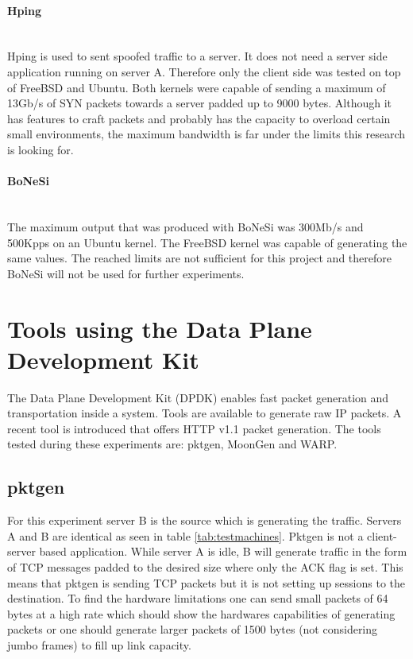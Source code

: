 \paragraph{Hping}\mbox{}\\
Hping is used to sent spoofed traffic to a server. 
It does not need a server side application running on server A. Therefore only the client side was tested on top of FreeBSD and Ubuntu.
Both kernels were capable of sending a maximum of 13Gb/s of SYN packets towards a server padded up to 9000 bytes. Although it has features to craft packets and probably has the capacity to overload certain small environments, the maximum bandwidth is far under the limits this research is looking for.  

\paragraph{BoNeSi}\mbox{}\\
The maximum output that was produced with BoNeSi was 300Mb/s and 500Kpps on an Ubuntu kernel. 
The FreeBSD kernel was capable of generating the same values.
The reached limits are not sufficient for this project and therefore BoNeSi will not be used for further experiments. 

\section{Tools using the Data Plane Development Kit}
The Data Plane Development Kit (DPDK) enables fast packet generation and transportation inside a system. Tools are available to generate raw IP packets. A recent tool is introduced that offers HTTP v1.1 packet generation. The tools tested during these experiments are: pktgen, MoonGen and WARP. 

\subsection{pktgen}\label{sub:pktgen}
For this experiment server B is the source which is generating the traffic. 
Servers A and B are identical as seen in table \ref{tab:testmachines}. Pktgen is not a client-server based application.
While server A is idle, B will generate traffic in the form of TCP messages padded to the desired size where only the ACK flag is set. 
This means that pktgen is sending TCP packets but it is not setting up sessions to the destination.
To find the hardware limitations one can send small packets of 64 bytes at a high rate which should show the hardwares capabilities of generating packets or one should generate larger packets of 1500 bytes (not considering jumbo frames) to fill up link capacity.
 
